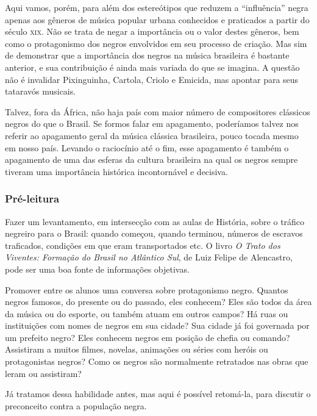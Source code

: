 \documentclass[11pt]{extarticle}
\begin{document}
Aqui vamos, porém, para além dos estereótipos que reduzem a “influência” negra
apenas aos gêneros de música popular urbana conhecidos e praticados a partir do
século \textsc{xix}. Não se trata de negar a importância ou o valor destes gêneros, bem
como o protagonismo dos negros envolvidos em seu processo de criação. Mas sim
de demonstrar que a importância dos negros na música brasileira é bastante
anterior, e sua contribuição é ainda mais variada do que se imagina. A questão
não é invalidar Pixinguinha, Cartola, Criolo e Emicida, mas apontar para seus
tataravós musicais.


Talvez, fora da África, não haja país com maior número de compositores
clássicos negros do que o Brasil. Se formos falar em apagamento, poderíamos
talvez nos referir ao apagamento geral da música clássica brasileira, pouco
tocada mesmo em nosso país. Levando o raciocínio até o fim, esse apagamento é
também o apagamento de uma das esferas da cultura brasileira na qual os negros
sempre tiveram uma importância histórica incontornável e decisiva.


\subsubsection{Pré-leitura}

Fazer um levantamento, em intersecção com as aulas de História, sobre o tráfico negreiro para o Brasil: quando
começou, quando terminou, números de escravos traficados, condições em que eram
transportados etc. O livro \emph{O Trato dos Viventes: Formação do Brasil no
Atlântico Sul}, de Luiz Felipe de Alencastro, pode ser uma boa fonte de
informações objetivas.

Promover entre os alunos uma conversa sobre protagonismo negro. Quantos negros
famosos, do presente ou do passado, eles conhecem? Eles são todos da área da
música ou do esporte, ou também atuam em outros campos? Há ruas ou instituições
com nomes de negros em sua cidade?  Sua cidade já foi governada por um prefeito
negro? Eles conhecem negros em posição de chefia ou comando? Assistiram a
muitos filmes, novelas, animações ou séries com heróis ou protagonistas negros?
Como os negros são normalmente retratados nas obras que leram ou assistiram?

Já tratamos dessa habilidade antes, mas aqui é possível retomá-la, para discutir o preconceito contra a população negra.
\end{document}
